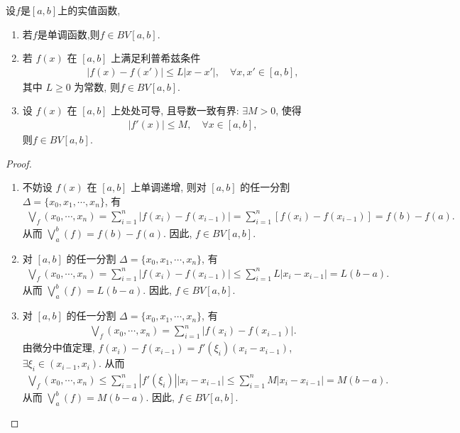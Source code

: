 \documentclass[../../main.tex]{subfiles}%
\begin{document}
\begin{proposition}\label{proposition:常见的一些有界变差函数}
设$f$是$[a,b]$上的实值函数,
\begin{enumerate}[(1)]
\item\label{proposition:常见的一些有界变差函数-1} 若$f$是单调函数,则$f\in BV[a,b]$.

\item\label{proposition:常见的一些有界变差函数-2} 若 $f(x)$ 在 $[a,b]$ 上满足利普希兹条件
\begin{align*}
|f(x)-f(x')| \leqslant L|x-x'|, \quad \forall x,x'\in[a,b],
\end{align*}
其中 $L\geqslant 0$ 为常数, 则$f\in BV[a,b]$.

\item\label{proposition:常见的一些有界变差函数-3} 设 $f(x)$ 在 $[a,b]$ 上处处可导, 且导数一致有界: $\exists M>0$, 使得
\begin{align*}
|f'(x)| \leqslant M, \quad \forall x\in[a,b],
\end{align*}
则$f\in BV[a,b]$.
\end{enumerate}
\end{proposition}
\begin{proof}
\begin{enumerate}[(1)]
\item 不妨设 $f(x)$ 在 $[a,b]$ 上单调递增, 则对 $[a,b]$ 的任一分割 $\Delta = \{x_0, x_1, \cdots, x_n\}$, 有
\begin{align*}
\bigvee_f(x_0, \cdots, x_n) = \sum_{i=1}^n |f(x_i)-f(x_{i-1})| 
= \sum_{i=1}^n [f(x_i)-f(x_{i-1})] = f(b)-f(a).
\end{align*}
从而 $\bigvee_a^b(f) = f(b)-f(a)$. 因此, $f\in BV[a,b]$.

\item 对 $[a,b]$ 的任一分割 $\Delta = \{x_0, x_1, \cdots, x_n\}$, 有
\begin{align*}
\bigvee_f(x_0, \cdots, x_n) = \sum_{i=1}^n |f(x_i)-f(x_{i-1})| 
\leqslant \sum_{i=1}^n L|x_i-x_{i-1}| = L(b-a).
\end{align*}
从而 $\bigvee_a^b(f) = L(b-a)$. 因此, $f\in BV[a,b]$.

\item 对 $[a,b]$ 的任一分割 $\Delta = \{x_0, x_1, \cdots, x_n\}$, 有
\begin{align*}
\bigvee_f(x_0, \cdots, x_n) = \sum_{i=1}^n |f(x_i)-f(x_{i-1})|.
\end{align*}
由微分中值定理, $f(x_i)-f(x_{i-1}) = f'(\xi_i)(x_i-x_{i-1})$, $\exists \xi_i\in(x_{i-1},x_i)$. 从而
\begin{align*}
\bigvee_f(x_0, \cdots, x_n) \leqslant \sum_{i=1}^n |f'(\xi_i)||x_i-x_{i-1}| \leqslant \sum_{i=1}^n M|x_i-x_{i-1}| = M(b-a).
\end{align*}
从而 $\bigvee_a^b(f) = M(b-a)$. 因此, $f\in BV[a,b]$.
\end{enumerate}

\end{proof}
\end{document}
